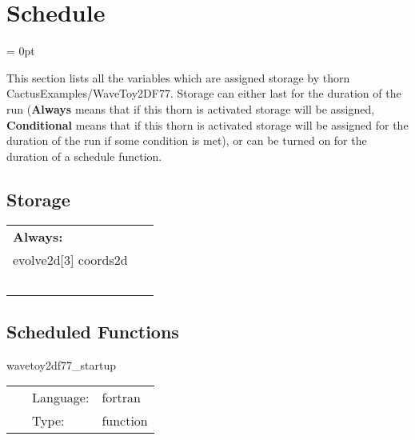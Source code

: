 \section{Schedule} 


\parskip = 0pt


\noindent This section lists all the variables which are assigned storage by thorn CactusExamples/WaveToy2DF77.  Storage can either last for the duration of the run ({\bf Always} means that if this thorn is activated storage will be assigned, {\bf Conditional} means that if this thorn is activated storage will be assigned for the duration of the run if some condition is met), or can be turned on for the duration of a schedule function.


\subsection*{Storage}

\hspace{5mm}

 \begin{tabular*}{160mm}{ll} 

{\bf Always:}&  ~ \\ 
 evolve2d[3] coords2d & ~\\ 
~ & ~\\ 
\end{tabular*} 


\subsection*{Scheduled Functions}
\vspace{5mm}


\hspace{5mm} wavetoy2df77\_startup 

\hspace{5mm}{\it register wavetoy2df77 banner } 


\hspace{5mm}

 \begin{tabular*}{160mm}{cll} 
~ & Language:  & fortran \\ 
~ & Type:  & function \\ 
\end{tabular*} 


\vspace{5mm}


